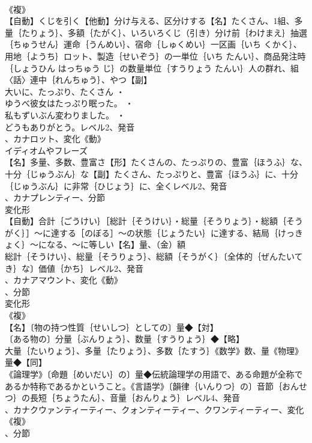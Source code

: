 \documentclass[8pt]{extreport}
\begin{document}
\begin{CJK}{UTF8}{min}
\\	《複》
\\	【自動】くじを引く【他動】分け与える、区分けする【名】たくさん、1組、多量｛たりょう｝、多額｛たがく｝、いろいろくじ（引き）分け前｛わけまえ｝抽選｛ちゅうせん｝運命｛うんめい｝、宿命｛しゅくめい｝一区画｛いち くかく｝、用地｛ようち｝ロット、製造｛せいぞう｝の一単位｛いち たんい｝、商品発注時｛しょうひん はっちゅう じ｝の数量単位｛すうりょう たんい｝人の群れ、組〈話〉連中｛れんちゅう｝、やつ【副】
\\	大いに、たっぷり、たくさん ・
\\	ゆうべ彼女はたっぷり眠った。 ・
\\	私もずいぶん変わりました。 ・
\\	どうもありがとう。レベル2、発音
\\	、カナロット、変化《動》
\\	イディオムやフレーズ 
\\	【名】多量、多数、豊富さ【形】たくさんの、たっぷりの、豊富｛ほうふ｝な、十分｛じゅうぶん｝な【副】たくさん、たっぷりと、豊富｛ほうふ｝に、十分｛じゅうぶん｝に非常｛ひじょう｝に、全くレベル2、発音
\\	、カナプレンティー、分節
\\	変化形 
\\	【自動】合計｛ごうけい｝［総計｛そうけい｝・総量｛そうりょう｝・総額｛そうがく｝］～に達する［のぼる］～の状態｛じょうたい｝に達する、結局｛けっきょく｝～になる、～に等しい【名】量、（金）額
\\	総計｛そうけい｝、総量｛そうりょう｝、総額｛そうがく｝〔全体的｛ぜんたいてき｝な〕価値｛かち｝レベル2、発音
\\	、カナアマウント、変化《動》
\\	、分節
\\	変化形 
\\	《複》
\\	【名】〔物の持つ性質｛せいしつ｝としての〕量◆【対】
\\	〔ある物の〕分量｛ぶんりょう｝、数量｛すうりょう｝◆【略】
\\	大量｛たいりょう｝、多量｛たりょう｝、多数｛たすう｝《数学》数、量《物理》量◆【同】
\\	《論理学》〔命題｛めいだい｝の〕量◆伝統論理学の用語で、ある命題が全称であるか特称であるかということ。《言語学》〔韻律｛いんりつ｝の〕音節｛おんせつ｝の長短｛ちょうたん｝、音量｛おんりょう｝レベル4、発音
\\	、カナクウァンティーティー、クォンティーティー、クワンティーティー、変化《複》
\\	、分節

\end{CJK}
\end{document}
